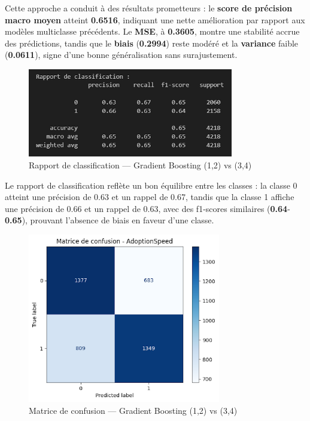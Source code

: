 \documentclass[a4paper,12pt]{article}
\begin{document}
Cette approche a conduit à des résultats prometteurs : le \textbf{score de précision macro moyen} atteint \textbf{0.6516}, indiquant une nette amélioration par rapport aux modèles multiclasse précédents. Le \textbf{MSE}, à \textbf{0.3605}, montre une stabilité accrue des prédictions, tandis que le \textbf{biais} (\textbf{0.2994}) reste modéré et la \textbf{variance} faible (\textbf{0.0611}), signe d’une bonne généralisation sans surajustement.

\begin{figure}[H]
    \centering
    \includegraphics[width=0.8\textwidth]{classification_report_gb_12_vs_34.png}
    \caption{Rapport de classification — Gradient Boosting (1,2) vs (3,4)}
    \label{fig:gb_report_12_34}
\end{figure}

Le rapport de classification reflète un bon équilibre entre les classes : la classe 0 atteint une précision de 0.63 et un rappel de 0.67, tandis que la classe 1 affiche une précision de 0.66 et un rappel de 0.63, avec des f1-scores similaires (\textbf{0.64}-\textbf{0.65}), prouvant l’absence de biais en faveur d’une classe.

\begin{figure}[H]
    \centering
    \includegraphics[width=0.75\textwidth]{confusion_matrix_gb_12_vs_34.png}
    \caption{Matrice de confusion — Gradient Boosting (1,2) vs (3,4)}
    \label{fig:gb_confusion_12_34}
\end{figure}
\end{document}
